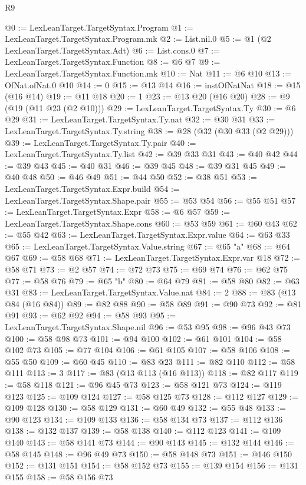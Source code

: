 \begin{lexlean}{R9}
\begin{coremodule}
@0 := LexLeanTarget.TargetSyntax.Program
@1 := LexLeanTarget.TargetSyntax.Program.mk
@2 := List.nil.{0}
@5 := @1 (@2 LexLeanTarget.TargetSyntax.Adt)
@6 := List.cons.{0}
@7 := LexLeanTarget.TargetSyntax.Function
@8 := @6 @7
@9 := LexLeanTarget.TargetSyntax.Function.mk
@10 := Nat
@11 := @6 @10
@13 := OfNat.ofNat.{0} @10
@14 := 0
@15 := @13 @14
@16 := instOfNatNat
@18 := @15 (@16 @14)
@19 := @11 @18
@20 := 1
@23 := @13 @20 (@16 @20)
@28 := @9 (@19 (@11 @23 (@2 @10)))
@29 := LexLeanTarget.TargetSyntax.Ty
@30 := @6 @29
@31 := LexLeanTarget.TargetSyntax.Ty.nat
@32 := @30 @31
@33 := LexLeanTarget.TargetSyntax.Ty.string
@38 := @28 (@32 (@30 @33 (@2 @29)))
@39 := LexLeanTarget.TargetSyntax.Ty.pair
@40 := LexLeanTarget.TargetSyntax.Ty.list
@42 := @39 @33 @31
@43 := @40 @42
@44 := @39 @43
@45 := @40 @31
@46 := @39 @45
@48 := @39 @31 @45
@49 := @40 @48
@50 := @46 @49
@51 := @44 @50
@52 := @38 @51
@53 := LexLeanTarget.TargetSyntax.Expr.build
@54 := LexLeanTarget.TargetSyntax.Shape.pair
@55 := @53 @54
@56 := @55 @51
@57 := LexLeanTarget.TargetSyntax.Expr
@58 := @6 @57
@59 := LexLeanTarget.TargetSyntax.Shape.cons
@60 := @53 @59
@61 := @60 @43
@62 := @55 @42
@63 := LexLeanTarget.TargetSyntax.Expr.value
@64 := @63 @33
@65 := LexLeanTarget.TargetSyntax.Value.string
@67 := @65 "a"
@68 := @64 @67
@69 := @58 @68
@71 := LexLeanTarget.TargetSyntax.Expr.var @18
@72 := @58 @71
@73 := @2 @57
@74 := @72 @73
@75 := @69 @74
@76 := @62 @75
@77 := @58 @76
@79 := @65 "b"
@80 := @64 @79
@81 := @58 @80
@82 := @63 @31
@83 := LexLeanTarget.TargetSyntax.Value.nat
@84 := 2
@88 := @83 (@13 @84 (@16 @84))
@89 := @82 @88
@90 := @58 @89
@91 := @90 @73
@92 := @81 @91
@93 := @62 @92
@94 := @58 @93
@95 := LexLeanTarget.TargetSyntax.Shape.nil
@96 := @53 @95
@98 := @96 @43 @73
@100 := @58 @98 @73
@101 := @94 @100
@102 := @61 @101
@104 := @58 @102 @73
@105 := @77 @104
@106 := @61 @105
@107 := @58 @106
@108 := @55 @50
@109 := @60 @45
@110 := @83 @23
@111 := @82 @110
@112 := @58 @111
@113 := 3
@117 := @83 (@13 @113 (@16 @113))
@118 := @82 @117
@119 := @58 @118
@121 := @96 @45 @73
@123 := @58 @121 @73
@124 := @119 @123
@125 := @109 @124
@127 := @58 @125 @73
@128 := @112 @127
@129 := @109 @128
@130 := @58 @129
@131 := @60 @49
@132 := @55 @48
@133 := @90 @123
@134 := @109 @133
@136 := @58 @134 @73
@137 := @112 @136
@138 := @132 @137
@139 := @58 @138
@140 := @112 @123
@141 := @109 @140
@143 := @58 @141 @73
@144 := @90 @143
@145 := @132 @144
@146 := @58 @145
@148 := @96 @49 @73
@150 := @58 @148 @73
@151 := @146 @150
@152 := @131 @151
@154 := @58 @152 @73
@155 := @139 @154
@156 := @131 @155
@158 := @58 @156 @73

\end{coremodule}
\end{lexlean}
